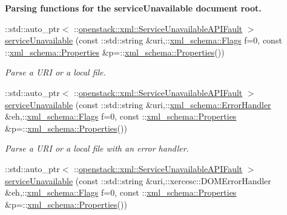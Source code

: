 \begin{Indent}{\bf Parsing functions for the serviceUnavailable document root.}\par
\begin{DoxyCompactItemize}
\item 
::std::auto\_\-ptr$<$ ::\hyperlink{classopenstack_1_1xml_1_1ServiceUnavailableAPIFault}{openstack::xml::ServiceUnavailableAPIFault} $>$ \hyperlink{namespaceopenstack_1_1xml_afb248405142f63e60ebd4c0741d7046b}{serviceUnavailable} (const ::std::string \&uri,::\hyperlink{namespacexml__schema_affb4c227cbd9aa7453dd1dc5a1401943}{xml\_\-schema::Flags} f=0, const ::\hyperlink{namespacexml__schema_ad27ce19a7ee1d3b1064092648898f64c}{xml\_\-schema::Properties} \&p=::\hyperlink{namespacexml__schema_ad27ce19a7ee1d3b1064092648898f64c}{xml\_\-schema::Properties}())
\begin{DoxyCompactList}\small\item\em Parse a URI or a local file. \item\end{DoxyCompactList}\item 
::std::auto\_\-ptr$<$ ::\hyperlink{classopenstack_1_1xml_1_1ServiceUnavailableAPIFault}{openstack::xml::ServiceUnavailableAPIFault} $>$ \hyperlink{namespaceopenstack_1_1xml_a46bb0392b147cd7b7416caf0bcd97a61}{serviceUnavailable} (const ::std::string \&uri,::\hyperlink{namespacexml__schema_ab1c9361bfd3b404eaabf0c31eded79dc}{xml\_\-schema::ErrorHandler} \&eh,::\hyperlink{namespacexml__schema_affb4c227cbd9aa7453dd1dc5a1401943}{xml\_\-schema::Flags} f=0, const ::\hyperlink{namespacexml__schema_ad27ce19a7ee1d3b1064092648898f64c}{xml\_\-schema::Properties} \&p=::\hyperlink{namespacexml__schema_ad27ce19a7ee1d3b1064092648898f64c}{xml\_\-schema::Properties}())
\begin{DoxyCompactList}\small\item\em Parse a URI or a local file with an error handler. \item\end{DoxyCompactList}\item 
::std::auto\_\-ptr$<$ ::\hyperlink{classopenstack_1_1xml_1_1ServiceUnavailableAPIFault}{openstack::xml::ServiceUnavailableAPIFault} $>$ \hyperlink{namespaceopenstack_1_1xml_a106c66af7097b264f5938a67714fc5db}{serviceUnavailable} (const ::std::string \&uri,::xercesc::DOMErrorHandler \&eh,::\hyperlink{namespacexml__schema_affb4c227cbd9aa7453dd1dc5a1401943}{xml\_\-schema::Flags} f=0, const ::\hyperlink{namespacexml__schema_ad27ce19a7ee1d3b1064092648898f64c}{xml\_\-schema::Properties} \&p=::\hyperlink{namespacexml__schema_ad27ce19a7ee1d3b1064092648898f64c}{xml\_\-schema::Properties}())

\end{DoxyCompactItemize}
\end{Indent}
